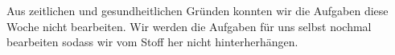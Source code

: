 \documentclass[12pt,german,a4paper]{article}
\author{Mike Lenz, Jonas Tesfamariam}
\begin{document}
\maketitle
Aus zeitlichen und gesundheitlichen Gründen konnten wir die Aufgaben diese Woche nicht bearbeiten. Wir werden die Aufgaben für uns selbst nochmal bearbeiten sodass wir vom Stoff her nicht hinterherhängen. 

\end{document}
